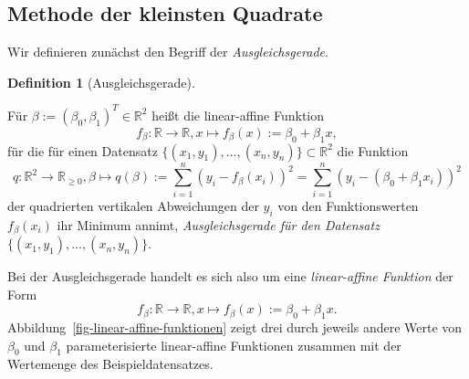 \documentclass[
  letterpaper,
  DIV=11]{scrartcl}
\theoremstyle{plain}
\theoremstyle{definition}
\newtheorem{definition}{Definition}[section]
\theoremstyle{remark}
\begin{document}
\hypertarget{sec-kq-methode}{%
\subsection{Methode der kleinsten Quadrate}\label{sec-kq-methode}}

Wir definieren zunächst den Begriff der \emph{Ausgleichsgerade}.

\begin{definition}[Ausgleichsgerade]\protect\hypertarget{def-ausgleichsgerade}{}\label{def-ausgleichsgerade}

Für \(\beta := (\beta_0,\beta_1)^T \in \mathbb{R}^2\) heißt die
linear-affine Funktion \begin{equation}
f_\beta : \mathbb{R} \to \mathbb{R}, x \mapsto f_\beta(x) := \beta_0 + \beta_1 x,
\end{equation} für die für einen Datensatz
\(\{(x_1,y_1),...,(x_n,y_n)\} \subset \mathbb{R}^2\) die Funktion
\begin{equation}
q : \mathbb{R}^2 \to \mathbb{R}_{\ge 0}, \beta \mapsto q(\beta)
:= \sum_{i=1}^n (y_i-f_\beta(x_i))^2
 = \sum_{i=1}^n (y_i- (\beta_0 + \beta_1x_i))^2
\end{equation} der quadrierten vertikalen Abweichungen der \(y_i\) von
den Funktionswerten \(f_{\beta}(x_i)\) ihr Minimum annimt,
\emph{Ausgleichsgerade für den Datensatz
\(\{(x_1,y_1),...,(x_n,y_n)\}\)}.

\end{definition}

Bei der Ausgleichsgerade handelt es sich also um eine
\emph{linear-affine Funktion} der Form \begin{equation}
f_\beta : \mathbb{R} \to \mathbb{R}, x \mapsto f_\beta(x) := \beta_0 + \beta_1 x.
\end{equation} Abbildung~\ref{fig-linear-affine-funktionen} zeigt drei
durch jeweils andere Werte von \(\beta_0\) und \(\beta_1\)
parameterisierte linear-affine Funktionen zusammen mit der Wertemenge
des Beispieldatensatzes.
\end{document}
